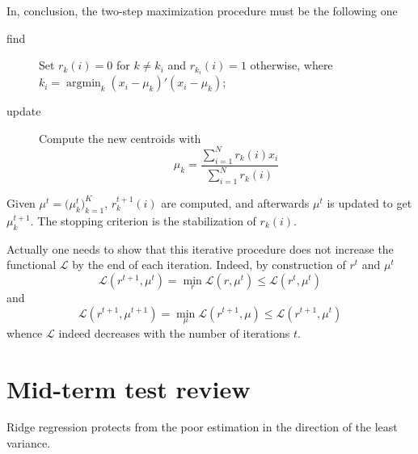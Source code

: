 \documentclass[a4paper]{article}
\newcommand{\Lcal}{\mathcal{L}}
\newcommand{\argmin}{\mathop{\text{argmin}}}
\begin{document}
In, conclusion, the two-step maximization procedure must be the following one \begin{description}
	\item[find] Set $r_k(i)=0$ for $k\neq k_i$ and $r_{k_i}(i)=1$ otherwise, where
	$k_i = \argmin_k (x_i-\mu_k)'(x_i-\mu_k)$;
	\item[update] Compute the new centroids with
	\[\mu_k = \frac{\sum_{i=1}^N r_k(i) x_i}{\sum_{i=1}^N r_k(i)}\]
\end{description}
Given $\mu^t = \bigl(\mu_k^t\bigr)_{k=1}^K$, $r_k^{t+1}(i)$ are computed,
and afterwards $\mu^t$ is updated to get $\mu_k^{t+1}$. The stopping criterion
is the stabilization of $r_k(i)$.

Actually one needs to show that this iterative procedure does not increase
the functional $\Lcal$ by the end of each iteration. Indeed, by construction
of $r^t$ and $\mu^t$
\[\Lcal(r^{t+1}, \mu^t) = \min_r \Lcal(r, \mu^t) \leq \Lcal(r^t, \mu^t)\]
and
\[\Lcal(r^{t+1}, \mu^{t+1}) = \min_\mu \Lcal(r^{t+1}, \mu) \leq \Lcal(r^{t+1}, \mu^t)\]
whence $\Lcal$ indeed decreases with the number of iterations $t$.




\clearpage
\section*{Mid-term test review} %
\label{sec:mid_term_test_review}
Ridge regression protects from the poor estimation in the direction of the least variance.
\end{document}
